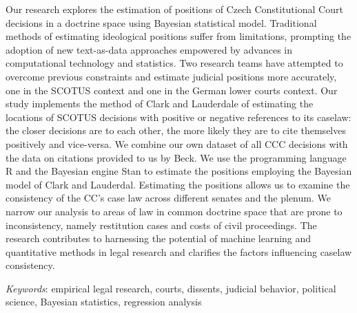 \documentclass[
  11pt,
]{article}
\renewenvironment{abstract}
 {{%
    \setlength{\leftmargin}{0mm}
    \setlength{\rightmargin}{\leftmargin}%
  }%
  \relax}
 {\endlist}
\begin{document}
\begin{abstract}


    \vskip 8.5pt %

\noindent \small{Our research explores the estimation of positions of
Czech Constitutional Court decisions in a doctrine space using Bayesian
statistical model. Traditional methods of estimating ideological
positions suffer from limitations, prompting the adoption of new
text-as-data approaches empowered by advances in computational
technology and statistics. Two research teams have attempted to overcome
previous constraints and estimate judicial positions more accurately,
one in the SCOTUS context and one in the German lower courts context.
Our study implements the method of Clark and Lauderdale of estimating
the locations of SCOTUS decisions with positive or negative references
to its caselaw: the closer decisions are to each other, the more likely
they are to cite themselves positively and vice-versa. We combine our
own dataset of all CCC decisions with the data on citations provided to
us by Beck. We use the programming language R and the Bayesian engine
Stan to estimate the positions employing the Bayesian model of Clark and
Lauderdal. Estimating the positions allows us to examine the consistency
of the CC's case law across different senates and the plenum. We narrow
our analysis to areas of law in common doctrine space that are prone to
inconsistency, namely restitution cases and costs of civil proceedings.
The research contributes to harnessing the potential of machine learning
and quantitative methods in legal research and clarifies the factors
influencing caselaw consistency.}


\vskip 8.5pt \noindent \emph{Keywords}: empirical legal research,
courts, dissents, judicial behavior, political science, Bayesian
statistics, regression analysis \par




\end{abstract}


\vskip -8.5pt

{
\hypersetup{linkcolor=black}
\setcounter{tocdepth}{2}
\tableofcontents
}


{
\setcounter{tocdepth}{2}
\tableofcontents
}
\end{document}
